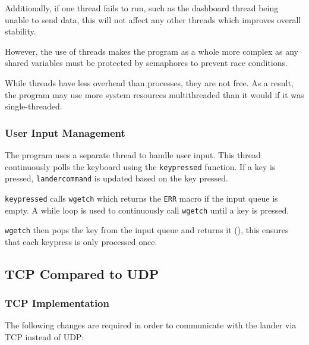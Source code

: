 \documentclass{article}
\newcommand{\code}[1]{\texttt{#1}}
\begin{document}
{        Additionally, if one thread fails to run, such as the dashboard thread being unable to send data,
        this will not affect any other threads which improves overall stability.

        However, the use of threads makes the program as a whole more complex as any shared variables
        must be protected by semaphores to prevent race conditions.

        While threads have less overhead than processes, they are not free. As a result, the program may
        use more system resources multithreaded than it would if it was single-threaded.

        \subsubsection{User Input Management}
        The program uses a separate thread to handle user input. This thread continuously polls
        the keyboard using the \code{key\textunderscore pressed} function. If a key is pressed,
        \code{landercommand} is updated based on the key pressed.

        \code{key\textunderscore pressed} calls \code{wgetch} which returns the \code{ERR} macro if
        the input queue is empty. A while loop is used to continuously call \code{wgetch} until a key
        is pressed.

        \code{wgetch} then pops the key from the input queue and returns it (\cite{linux_manual_wgetch3_nodate}),
        this ensures that each keypress is only processed once.

    \subsection{TCP Compared to UDP}
    \subsubsection{TCP Implementation}
    The following changes are required in order to communicate with the lander
    via TCP instead of UDP:

}
\end{document}
